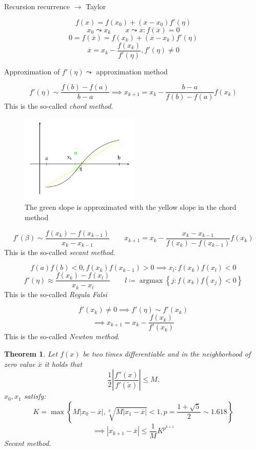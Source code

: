 \documentclass{article}
\newtheorem{theorem}{Theorem}
\newcommand{\set}[1]{\left\{#1\right\}}
\newcommand{\card}[1]{\left|#1\right|}
\DeclareMathOperator{\argmax}{argmax}
\begin{document}
Recursion recurrence $\to$ Taylor

\[ f(x) = f(x_0) + (x - x_0) f'(\eta) \]
\[ x_0 \leadsto x_k \qquad x \leadsto \overline x: f(\overline x) = 0 \]
\[ 0 = f(\overline x) = f(x_k) + (\overline x - x_k) f'(\eta) \]
\[ \overline x = x_k - \frac{f(x_k)}{f'(\eta)}, f'(\eta) \neq 0 \]

Approximation of $f'(\eta) \leadsto$ approximation method

\[ f'(\eta) \sim \frac{f(b) - f(a)}{b - a} \implies x_{k+1} = x_k - \frac{b - a}{f(b) - f(a)} f(x_k) \]
This is the so-called \emph{chord method}.

\begin{figure}[!h]
  \begin{center}
    \includegraphics[width=0.5\textwidth]{img/12_approximation.pdf}
    \caption{The green slope is approximated with the yellow slope in the chord method}
    \label{img:approx12}
  \end{center}
\end{figure}

\[ f'(\beta) \sim \frac{f(x_k) - f(x_{k-1})}{x_k - x_{k-1}} \qquad x_{k+1} = x_k - \frac{x_k - x_{k-1}}{f(x_k) - f(x_{k-1})} f(x_k) \]
This is the so-called \emph{secant method}.

\[ f(a) f(b) < 0, f(x_k) f(x_{k-1}) > 0 \implies x_l: f(x_k) f(x_l) < 0 \]
\[ f'(\eta) \approx \frac{f(x_k) - f(x_l)}{x_k - x_l} \qquad l \coloneqq \argmax\set{j: f(x_k) f(x_j) < 0} \]  %
This is the so-called \emph{Regula Falsi}

\[ f'(x_k) \neq 0 \implies f'(\eta) \sim f'(x_k) \]
\[ \implies x_{k+1} = x_k - \frac{f(x_k)}{f'(x_k)} \]
This is the so-called \emph{Newton method}.

\begin{theorem}
  Let $f(x)$ be two times differentiable and in the neighborhood of zero value $\overline x$ it holds that
  \[ \frac12 \card{\frac{f''(x)}{f'(\tilde x)}} \leq M. \]
  $x_0, x_1$ satisfy:
  \[ K = \max\set{M \card{x_0 - \overline x}, \sqrt[p]{M \card{x_1 - \overline x}} < 1, p = \frac{1 + \sqrt5}{2} \sim 1.618} \]
  \[ \implies \card{x_{k+1} - \overline x} \leq \frac{1}{M} K^{p^{k+1}} \]
  Secant method.
\end{theorem}
\end{document}
